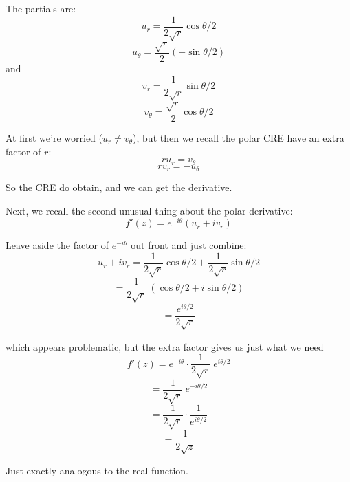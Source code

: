 \documentclass[11pt, oneside]{article}
\begin{document}
The partials are:
\[ u_r = \frac{1}{2 \sqrt{r}} \cos \theta/2 \]
\[ u_{\theta} = \frac{\sqrt{r}}{2} (- \sin \theta/2) \]
and
\[ v_r = \frac{1}{2 \sqrt{r}} \sin \theta/2 \]
\[ v_{\theta} = \frac{\sqrt{r}}{2} \cos \theta/2 \]

At first we're worried ($u_r \ne v_{\theta}$), but then we recall the polar CRE have an extra factor of $r$:
\[ r u_r = v_{\theta} \]
\[ r v_r = - u_{\theta} \]

So the CRE do obtain, and we can get the derivative.  

Next, we recall the second unusual thing about the polar derivative:
\[ f'(z) = e^{-i\theta} (u_r + i v_r) \]

Leave aside the factor of $e^{-i\theta}$ out front and just combine:
\[ u_r + i v_r = \frac{1}{2 \sqrt{r}} \cos \theta/2 + \frac{1}{2 \sqrt{r}} \sin \theta/2 \]
\[ = \frac{1}{2 \sqrt{r}} \ (\cos \theta/2 + i \sin \theta/2) \]
\[ = \frac{e^{i \theta/2}}{2 \sqrt{r}} \]

which appears problematic, but the extra factor gives us just what we need
\[ f'(z) = e^{-i\theta} \cdot \frac{1}{2 \sqrt{r}} \ e^{i \theta/2} \]
\[ = \frac{1}{2 \sqrt{r}} \ e^{-i \theta/2} \]
\[ = \frac{1}{2 \sqrt{r}} \cdot \frac{1}{e^{i \theta/2}} \]
\[ = \frac{1}{2 \sqrt{z}} \]

Just exactly analogous to the real function.
\end{document}
